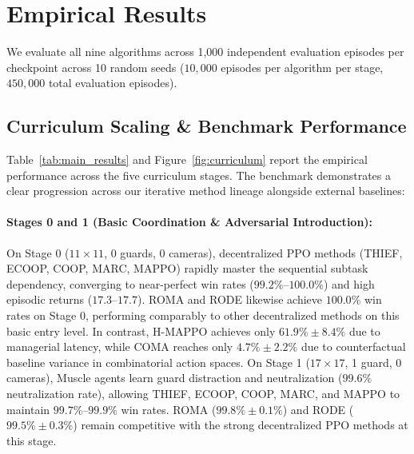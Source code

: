 \FloatBarrier
\section{Empirical Results}
\label{sec:results}

We evaluate all nine algorithms across 1,000 independent evaluation episodes per checkpoint across 10 random seeds ($10,\!000$ episodes per algorithm per stage, $450,\!000$ total evaluation episodes).

\subsection{Curriculum Scaling \& Benchmark Performance}
\label{sec:benchmark_scaling}

Table~\ref{tab:main_results} and Figure~\ref{fig:curriculum} report the empirical performance across the five curriculum stages. The benchmark demonstrates a clear progression across our iterative method lineage alongside external baselines:



\paragraph{Stages 0 and 1 (Basic Coordination \& Adversarial Introduction):}
On Stage 0 ($11 \times 11$, 0 guards, 0 cameras), decentralized PPO methods (THIEF, ECOOP, COOP, MARC, MAPPO) rapidly master the sequential subtask dependency, converging to near-perfect win rates ($99.2\%$--$100.0\%$) and high episodic returns ($17.3$--$17.7$). ROMA and RODE likewise achieve $100.0\%$ win rates on Stage 0, performing comparably to other decentralized methods on this basic entry level. In contrast, H-MAPPO achieves only $61.9\% \pm 8.4\%$ due to managerial latency, while COMA reaches only $4.7\% \pm 2.2\%$ due to counterfactual baseline variance in combinatorial action spaces. On Stage 1 ($17 \times 17$, 1 guard, 0 cameras), Muscle agents learn guard distraction and neutralization ($99.6\%$ neutralization rate), allowing THIEF, ECOOP, COOP, MARC, and MAPPO to maintain $99.7\%$--$99.9\%$ win rates. ROMA ($99.8\% \pm 0.1\%$) and RODE ($99.5\% \pm 0.3\%$) remain competitive with the strong decentralized PPO methods at this stage.

